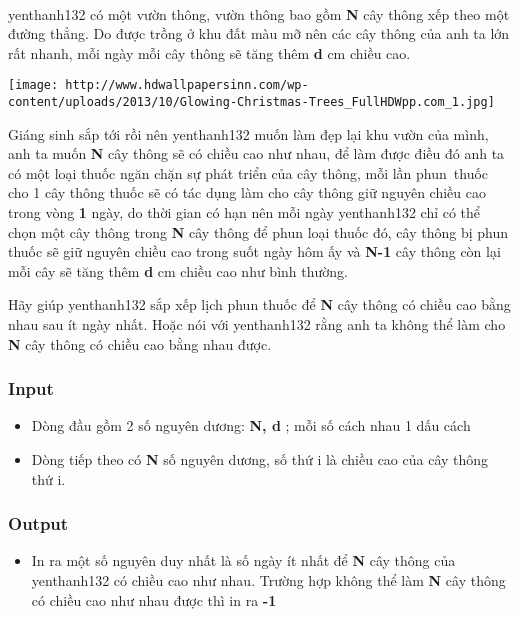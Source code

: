 

 

yenthanh132 có một vườn thông, vườn thông bao gồm \textbf{ N } cây thông xếp theo một đường thẳng. Do được trồng ở khu đất màu mỡ nên các cây thông của anh ta lớn rất nhanh, mỗi ngày mỗi cây thông sẽ tăng thêm \textbf{ d } cm chiều cao.


\texttt{[image: http://www.hdwallpapersinn.com/wp-content/uploads/2013/10/Glowing-Christmas-Trees\_FullHDWpp.com\_1.jpg]}

Giáng sinh sắp tới rồi nên yenthanh132 muốn làm đẹp lại khu vườn của mình, anh ta muốn \textbf{ N } cây thông sẽ có chiều cao như nhau, để làm được điều đó anh ta có một loại thuốc ngăn chặn sự phát triển của cây thông, mỗi lần phun thuốc cho 1 cây thông thuốc sẽ có tác dụng làm cho cây thông giữ nguyên chiều cao trong vòng \textbf{ 1 } ngày, do thời gian có hạn nên mỗi ngày yenthanh132 chỉ có thể chọn một cây thông trong \textbf{ N } cây thông để phun loại thuốc đó, cây thông bị phun thuốc sẽ giữ nguyên chiều cao trong suốt ngày hôm ấy và \textbf{ N-1 } cây thông còn lại mỗi cây sẽ tăng thêm \textbf{ d } cm chiều cao như bình thường.

Hãy giúp yenthanh132 sắp xếp lịch phun thuốc để \textbf{ N } cây thông có chiều cao bằng nhau sau ít ngày nhất. Hoặc nói với yenthanh132 rằng anh ta không thể làm cho \textbf{ N } cây thông có chiều cao bằng nhau được.

\subsubsection{Input}
\begin{itemize}
	\item Dòng đầu gồm 2 số nguyên dương: \textbf{ N, d } ; mỗi số cách nhau 1 dấu cách
	\item Dòng tiếp theo có \textbf{ N } số nguyên dương, số thứ i là chiều cao của cây thông thứ i.
\end{itemize}

\subsubsection{Output}
\begin{itemize}
	\item In ra một số nguyên duy nhất là số ngày ít nhất để \textbf{ N } cây thông của yenthanh132 có chiều cao như nhau. Trường hợp không thể làm \textbf{ N } cây thông có chiều cao như nhau được thì in ra \textbf{ -1 }
\end{itemize}

